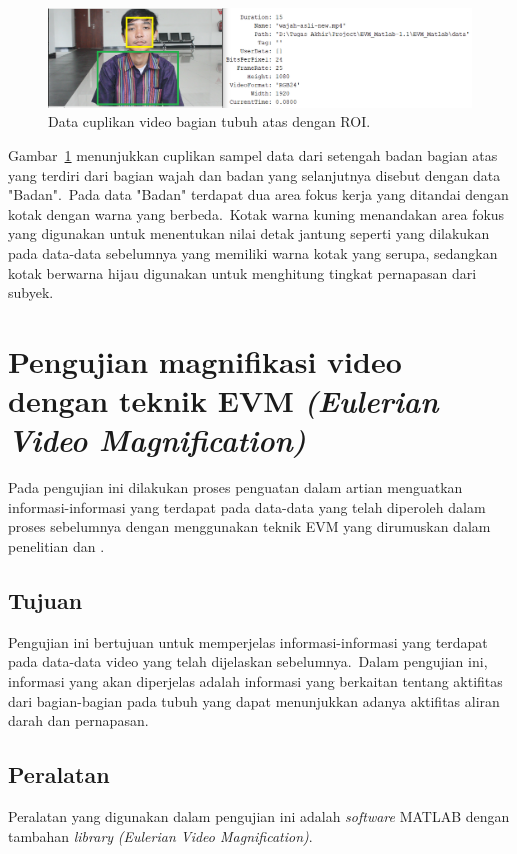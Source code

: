 \begin{figure}[ht]
	\vspace{0.5em}
	\centering
	\includegraphics[width=\textwidth]{badan_roi}
	\caption{Data cuplikan video bagian tubuh atas dengan ROI.}
	\label{fig:badan}   
\end{figure}
Gambar~\ref{fig:badan} menunjukkan cuplikan sampel data dari setengah badan bagian atas yang terdiri dari bagian wajah dan badan yang selanjutnya disebut dengan data "Badan".~Pada data "Badan" terdapat dua area fokus kerja yang ditandai dengan kotak dengan warna yang berbeda.~Kotak warna kuning menandakan area fokus yang digunakan untuk menentukan nilai detak jantung seperti yang dilakukan pada data-data sebelumnya yang memiliki warna kotak yang serupa, sedangkan kotak berwarna hijau digunakan untuk menghitung tingkat pernapasan dari subyek.

\newpage
\section{Pengujian magnifikasi video dengan teknik EVM \textit{(Eulerian Video Magnification)}}
Pada pengujian ini dilakukan proses penguatan dalam artian menguatkan informasi-informasi yang terdapat pada data-data yang telah diperoleh dalam proses sebelumnya dengan menggunakan teknik EVM yang dirumuskan dalam penelitian \citet{Wu2012} dan \citet{RubinsteinPhDThesis2014}.

\subsection{Tujuan}
Pengujian ini bertujuan untuk memperjelas informasi-informasi yang terdapat pada data-data video yang telah dijelaskan sebelumnya.~Dalam pengujian ini, informasi yang akan diperjelas adalah informasi yang berkaitan tentang aktifitas dari bagian-bagian pada tubuh yang dapat menunjukkan adanya aktifitas aliran darah dan pernapasan.

\subsection{Peralatan}
Peralatan yang digunakan dalam pengujian ini adalah \textit{software} MATLAB dengan tambahan \textit{library} \textit{(Eulerian Video Magnification)}.

